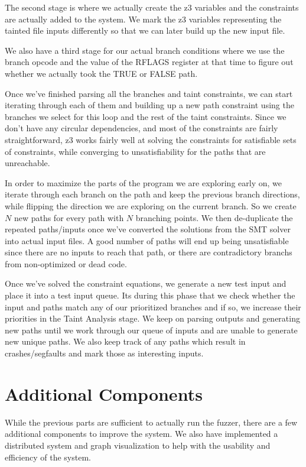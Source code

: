 The second stage is where we actually create the z3 variables and the
constraints are actually added to the system. We mark the z3 variables
representing the tainted file inputs differently so that we can later build up
the new input file.

We also have a third stage for our actual branch conditions where we use the
branch opcode and the value of the RFLAGS register at that time to figure out
whether we actually took the TRUE or FALSE path.

Once we've finished parsing all the branches and taint constraints, we can start
iterating through each of them and building up a new path constraint using the
branches we select for this loop and the rest of the taint constraints. Since we
don't have any circular dependencies, and most of the constraints are fairly
straightforward, z3 works fairly well at solving the constraints for satisfiable
sets of constraints, while converging to unsatisfiability for the paths that are
unreachable.

In order to maximize the parts of the program we are exploring early on, we
iterate through each branch on the path and keep the previous branch directions,
while flipping the direction we are exploring on the current branch. So we
create $N$ new paths for every path with $N$ branching points. We then
de-duplicate the repeated paths/inputs once we've converted the solutions from
the SMT solver into actual input files. A good number of paths will end up being
unsatisfiable since there are no inputs to reach that path, or there are
contradictory branchs from non-optimized or dead code.

Once we've solved the constraint equations, we generate a new test input and
place it into a test input queue. Its during this phase that we check whether
the input and paths match any of our prioritized branches and if so, we increase
their priorities in the Taint Analysis stage. We keep on parsing outputs and
generating new paths until we work through our queue of inputs and are unable to
generate new unique paths. We also keep track of any paths which result in
crashes/segfaults and mark those as interesting inputs.

\section{Additional Components}
While the previous parts are sufficient to actually run the fuzzer, there are
a few additional components to improve the system. We also have implemented a
distributed system and graph visualization to help with the usability and
efficiency of the system.

